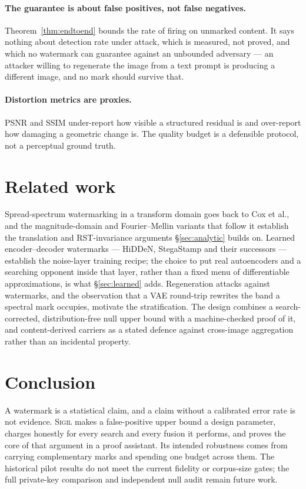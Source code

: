 \documentclass[10pt,twocolumn]{article}
\theoremstyle{definition}
\theoremstyle{remark}
\newcommand{\sigil}{\textsc{Sigil}}
\begin{document}
\paragraph{The guarantee is about false positives, not false negatives.}
Theorem~\ref{thm:endtoend} bounds the rate of firing on unmarked content. It says
nothing about detection rate under attack, which is measured, not proved, and
which no watermark can guarantee against an unbounded adversary --- an attacker
willing to regenerate the image from a text prompt is producing a different
image, and no mark should survive that.

\paragraph{Distortion metrics are proxies.} PSNR and SSIM under-report how
visible a structured residual is and over-report how damaging a geometric change
is. The quality budget is a defensible protocol, not a perceptual ground truth.

\section{Related work}

Spread-spectrum watermarking in a transform domain goes back to Cox et al., and
the magnitude-domain and Fourier--Mellin variants that follow it establish the
translation and RST-invariance arguments \S\ref{sec:analytic} builds on. Learned
encoder--decoder watermarks --- HiDDeN, StegaStamp and their successors ---
establish the noise-layer training recipe; the choice to put real autoencoders
and a searching opponent inside that layer, rather than a fixed menu of
differentiable approximations, is what \S\ref{sec:learned} adds. Regeneration
attacks against watermarks, and the observation that a VAE round-trip rewrites
the band a spectral mark occupies, motivate the stratification. The design
combines a search-corrected, distribution-free null upper bound with a
machine-checked proof of it, and content-derived
carriers as a stated defence against cross-image aggregation rather than an
incidental property.

\section{Conclusion}

A watermark is a statistical claim, and a claim without a calibrated error rate
is not evidence. \sigil{} makes a false-positive upper bound a design parameter,
charges honestly for every search and every fusion it performs, and proves the
core of that argument in a proof assistant. Its intended robustness comes from
carrying complementary marks and spending one budget across them. The historical
pilot results do not meet the current fidelity or corpus-size gates; the full
private-key comparison and independent null audit remain future work.
\end{document}

